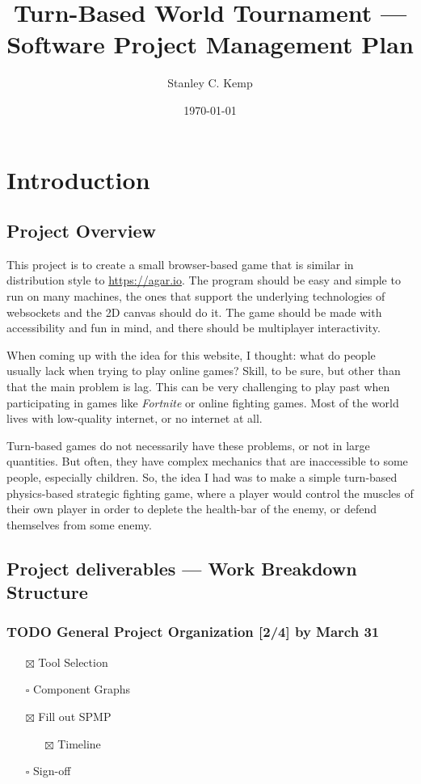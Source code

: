 \documentclass[11pt]{article}
\author{Stanley C. Kemp}
\date{\today}
\title{Turn-Based World Tournament --- Software Project Management Plan}
\begin{document}
\maketitle
\section{Introduction}
\label{sec:org4481e37}
\subsection{Project Overview}
\label{sec:orgc66f76b}
 This project is to create a small browser-based game that is similar in distribution style to \url{https://agar.io}.
The program should be easy and simple to run on many machines, the ones that support the underlying technologies 
of websockets and the 2D canvas should do it. The game should be made with accessibility and fun in mind, and there 
should be multiplayer interactivity.

When coming up with the idea for this website,
I thought: what do people usually lack when trying to play online games? Skill, to be sure, but other than that
the main problem is lag. This can be very challenging to play past when participating in games like \emph{Fortnite} or
online fighting games. Most of the world lives with low-quality internet, or no internet at all. 

Turn-based games do not necessarily have these problems, or not in large quantities. But often, they have complex
mechanics that are inaccessible to some people, especially children. So, the idea I had was to make 
a simple turn-based physics-based strategic fighting game, where a player would control the muscles of their own
player in order to deplete the health-bar of the enemy, or defend themselves from some enemy.
\subsection{Project deliverables --- Work Breakdown Structure}
\label{sec:orgc70ab07}
\subsubsection{{\bfseries\sffamily TODO} General Project Organization [2/4] by March 31}
\label{sec:orged2e22f}
\begin{itemize}
\item[{$\boxtimes$}] Tool Selection
\item[{$\square$}] Component Graphs
\item[{$\boxtimes$}] Fill out SPMP
\begin{itemize}
\item[{$\boxtimes$}] Timeline
\end{itemize}
\item[{$\square$}] Sign-off
\end{itemize}
\end{document}
